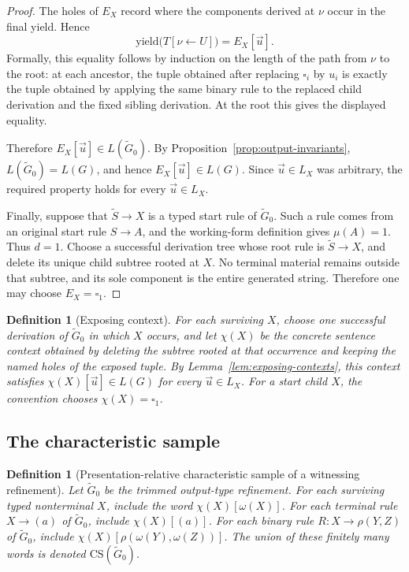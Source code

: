 \documentclass[11pt,a4paper]{article}
\newtheorem{definition}[theorem]{Definition}
\theoremstyle{remark}
\newcommand{\CS}{\mathrm{CS}}
\newcommand{\tuple}[1]{\vec{#1}}
\newcommand{\blank}{\square}
\newcommand{\yield}{\mathrm{yield}}
\begin{document}
\begin{proof}
The holes of \(E_X\) record where the components derived at \(\nu\) occur in
the final yield.  Hence
\[
  \yield\bigl(T[\nu\leftarrow U]\bigr)
  =
  E_X[\tuple u].
\]
Formally, this equality follows by induction on the length of the path from
\(\nu\) to the root: at each ancestor, the tuple obtained after replacing
\(\blank_i\) by \(u_i\) is exactly the tuple obtained by applying the same
binary rule to the replaced child derivation and the fixed sibling derivation.
At the root this gives the displayed equality.

Therefore \(E_X[\tuple u]\in L(\widetilde G_0)\).  By
Proposition~\ref{prop:output-invariants}, \(L(\widetilde G_0)=L(G)\), and
hence \(E_X[\tuple u]\in L(G)\).
Since \(\tuple u\in L_X\) was arbitrary, the required property holds for every
\(\tuple u\in L_X\).

Finally, suppose that \(\widetilde S\to X\) is a typed start rule of
\(\widetilde G_0\).  Such a rule comes from an
original start rule \(S\to A\), and the working-form definition gives
\(\mu(A)=1\).  Thus \(d=1\).  Choose a successful derivation tree whose root rule is
\(\widetilde S\to X\), and delete its unique child subtree rooted at \(X\).
No terminal material remains outside that subtree, and its sole component is
the entire generated string.  Therefore one may choose \(E_X=\blank_1\).
\end{proof}

\begin{definition}[Exposing context]
\label{def:exposing-context}
For each surviving \(X\), choose one successful derivation of
\(\widetilde G_0\) in which \(X\) occurs, and let \(\chi(X)\) be the concrete
sentence context obtained by deleting the subtree rooted at that occurrence and
keeping the named holes of the exposed tuple.  By
Lemma~\ref{lem:exposing-contexts}, this context satisfies
\(\chi(X)[\tuple u]\in L(G)\) for every \(\tuple u\in L_X\).  For a start child
\(X\), the convention chooses \(\chi(X)=\blank_1\).
\end{definition}

\subsection{The characteristic sample}
\label{subsec:learner-grammar}

\begin{definition}[Presentation-relative characteristic sample of a witnessing refinement]
\label{def:cs}
Let \(\widetilde G_0\) be the trimmed output-type refinement.  For each
surviving typed nonterminal \(X\), include the word \(\chi(X)[\omega(X)]\).  For
each terminal rule \(X\to(a)\) of \(\widetilde G_0\), include
\(\chi(X)[(a)]\).  For each binary rule \(R\colon X\to\rho(Y,Z)\) of
\(\widetilde G_0\), include \(\chi(X)[\rho(\omega(Y),\omega(Z))]\).  The union
of these finitely many words is denoted \(\CS(\widetilde G_0)\).
\end{definition}
\end{document}
